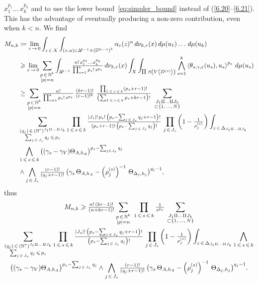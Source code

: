 \documentclass[AHL,Unicode,longabstracts,published]{cedram}
\DeclarePairedDelimiter{\abs}{\lvert}{\rvert}
\newcommand*\bN{\mathbb{N}}
\newcommand*\bS{\mathbb{S}}
\newcommand\bDel{\mbox{$\Delta$\newline \scalebox{.6}{\raisebox{3pt}{$\mkern-22mu\not{}\mkern12mu$}}}}
\newcommand\bDelta{\mathchoice{\bDel}{\bDel}{\scalebox{.7}{\bDel}}{\scalebox{.5}{\bDel}}}
\let\leq\leqslant
\let\geq\geqslant
\newcommand*\bydef{\coloneqq}
\begin{document}
$x_1^{p_1}\ldots\,x_k^{p_k}$ and to use the lower bound~\eqref{eq:simpler_bound} instead of (\eqref{6.20}--\eqref{6.21}). This has the advantage of eventually producing a non-zero contribution, even when $k<n$. We find
\begin{align*}
M_{n,k} &\bydef\lim_{\varepsilon\,\to\,0}\int_{z\,\in\,X}\int_{(x,u)\in
\bDelta^{k-1}
\times\left(\bS^{2r-1}\right)^k}
\alpha_\varepsilon(z)^n\,d\nu_{k,r}(x)\,d\mu(u_1)\ldots\,d\mu(u_k)\\
&\geq\lim_{\varepsilon\,\to\,0}
\sum_{\substack{p\,\in\,\bN^k\\ \abs{p}=n}}
\int_{\bDelta^{k-1}}
\tfrac{n!\,x_1^{p_1}\ldots x_k^{p_k}}{\prod_{s=1}^kp_s!\,s^{p_s}}\,d\nu_{k,r}(x)
\int_X\int_{\raise-1pt\hbox{$\Pi$}\; S\left(V\left\langle D^{(s)}\right\rangle\right)}\bigwedge_{s=1}^k
\left\langle\theta_{s,\gamma,\varepsilon}(u_s),u_s\right\rangle^{p_s}\, d\mu(u_s)
\\
&\ge
\sum_{\substack{p\,\in\,\bN^k\\ \abs{p}=n}}
\tfrac{n!}{\prod_{s=1}^kp_s!\,s^{p_s}}\,
\tfrac{(kr-1)!}{(r-1)!^k}\;
\tfrac{\prod_{1\,\leq\,s\,\leq\,k}\left(p_s+r-1\right)!}{\left(\sum_{1\,\leq\,s\,\leq\,k}p_s+kr-1\right)!}~
\sum_{\substack{ J_1\amalg\ldots\amalg J_k\\
\subset\{1,\,\dotsc,\,N\}}}
\\
&\sum_{\substack{ (q_j)\,\in\,(\bN^*)^{J_1\amalg\ldots\amalg J_k} \\
\sum_{j\,\in\,J_s}q_j\,\leq\,p_s}}
\prod_{1\,\leq\,s\,\leq\,k}\tfrac{\abs{J_s}!\,p_s!\,\left(p_s-\sum_{j\,\in\,J_s}q_j+r-1\right)!}{(p_s+r-1)!\, \left(p_s-\sum_{j\,\in\,J_s}q_j\right)!}\,\prod_{j\,\in\,J_s}\left(1-\tfrac{1}{ \rho^{(s)}_j}\right)
\int_{z\,\in\,\Delta_{J_1\amalg\ldots\amalg J_k}}\\
&
\bigwedge_{1\,\leq\,s\,\leq\,k}\big((\gamma_s-\gamma_V)\Theta_{A,h_A}\big)^{p_s -\sum_{j\in J_s}q_j}
\\
&\wedge\bigwedge_{j\,\in\,J_s}\tfrac{(r-1)!}{ (q_j+r-1)!}\,
\big(\gamma_s\,\Theta_{A,h_A}- \left(\rho^{(s)}_j\right)^{-1}\,\Theta_{\Delta_j,h_j}\big)^{q_j-1},
\end{align*}
thus
\begin{multline}
M_{n,k}\geq\tfrac{n!\,(kr-1)!}{(n+kr-1)!}
\sum_{\substack{p\,\in\,\bN^k\\
\abs{p}=n}}~
\prod_{1\,\leq\,s\,\leq\,k}\tfrac{1}{ s^{p_s}}\,
\sum_{\substack{ J_1\amalg\ldots\amalg J_k
\\
\subset\{1,\,\dotsc,\,N\}}}
\\
\sum_{\substack{(q_j)\,\in\,(\bN^*)^{J_1\amalg\ldots\amalg J_k}
\\ \sum_{j\,\in\,J_s}q_j\,\leq\,p_s}}
\prod_{1\,\leq\,s\,\leq\,k}\tfrac{\abs{J_s}!\,\left(p_s-\sum_{j\,\in\,J_s}q_j+r-1\right)!}{\left(p_s-\sum_{j\,\in\,J_s}q_j\right)!}\,\prod_{j\,\in\,J_s}
\left(1-\tfrac{1}{\rho^{(s)}_j}\right)
\int_{z\,\in\,\Delta_{J_1\amalg\ldots\amalg J_k}}\bigwedge_{1\,\leq\,s\,\leq\,k}
\\
\big((\gamma_s-\gamma_V)\Theta_{A,h_A}\big)^{p_s-\sum_{j\,\in\,J_s}q_j}
\wedge\bigwedge_{j\,\in\,J_s}\tfrac{(r-1)!}{\left(q_j+r-1\right)!}\,
\big(\gamma_s\,\Theta_{A,h_A}- \left(\rho^{(s)}_j\right)^{-1}\,\Theta_{\Delta_j,h_j}\big)^{q_j-1}.
\end{multline}
\end{document}
